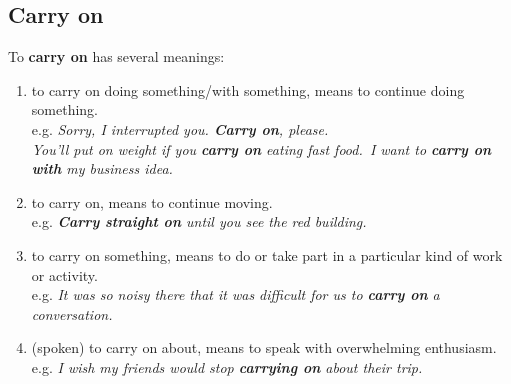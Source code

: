 \documentclass[hidelinks,10pt,a4paper]{article}
\begin{document}
\subsection{Carry on}
To \textbf{carry on} has several meanings:
\begin{enumerate}[label=(\alph*)]
	\item to carry on doing something/with something, means to continue doing something. \\
		e.g. \textit{Sorry, I interrupted you. \textbf{Carry on}, please.\\
		You'll put on weight if you \textbf{carry on} eating fast food.\
		I want to \textbf{carry on with} my business idea. }
	\item to carry on, means to continue moving. \\
		e.g. \textit{\textbf{Carry straight on} until you see the red building. }
	\item to carry on something, means to do or take part in a particular kind of work or activity. \\
		e.g. \textit{It was so noisy there that it was difficult for us to \textbf{carry on} a conversation. }
	\item (spoken) to carry on about, means to speak with overwhelming enthusiasm.\\
		e.g. \textit{I wish my friends would stop \textbf{carrying on} about their trip. }
\end{enumerate}
\end{document}
